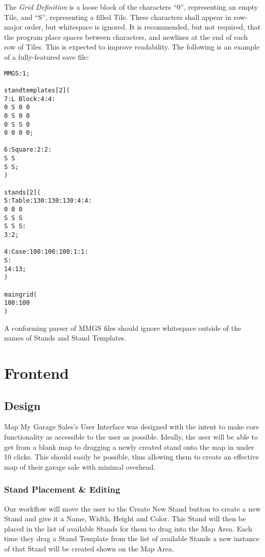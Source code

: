 \documentclass{report}
\begin{document}
The \emph{Grid Definition} is a loose block of the characters ``0'',
representing an empty Tile, and ``S'', representing a filled Tile.
These characters shall appear in row-major order, but whitespace is ignored.
It is recommended, but not required, that the program place spaces between
characters, and newlines at the end of each row of Tiles. This is expected to
improve readability.
\newpage
The following is an example of a fully-featured save file:
\begin{verbatim}
MMGS:1;

standtemplates[2](
7:L Block:4:4:
0 S 0 0
0 S 0 0
0 S S 0
0 0 0 0;

6:Square:2:2:
S S
S S;
)

stands[2](
5:Table:130:130:130:4:4:
0 0 0
S S S
S S S:
3:2;

4:Case:100:100:100:1:1:
S:
14:13;
)

maingrid(
100:100
)
\end{verbatim}

A conforming parser of MMGS files should ignore whitespace outside of the
names of Stands and Stand Templates.

\chapter{Frontend}

\section{Design}
Map My Garage Sales's User Interface was designed with the intent to make core functionality as accessible to the user as possible.  Ideally, the user will be able to get from a blank map to dragging a newly created stand onto the map in under 10 clicks.  This should easily be possible, thus allowing them to create an effective map of their garage sale with minimal overhead.  

\subsection{Stand Placement \& Editing}
Our workflow will move the user to the Create New Stand button to create a new Stand and give it a Name, Width, Height and Color.  This Stand will then be placed in the list of available Stands for them to drag into the Map Area.  Each time they drag a Stand Template from the list of available Stands a new instance of that Stand will be created shown on the Map Area.
\end{document}
